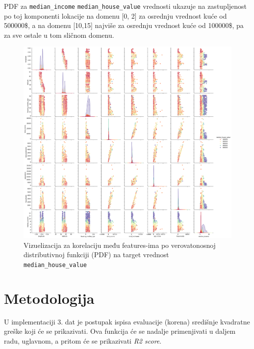 \documentclass[fontsize=12bp, paper=a4]{scrarticle}
\renewcommand\lstlistingname{Implementacija}
\renewcommand\lstlistlistingname{Implementacija}
\begin{document}
PDF za \verb*|median_income| \verb*|median_house_value| vrednosti ukazuje na zastupljenost po toj komponenti lokacije na domenu [0, 2] za osrednju vrednost kuće od 500000\$, a na domenu [10,15] najviše za osrednju vrednost kuće od 100000\$, pa za sve ostale u tom sličnom domenu.


\begin{figure}[h!]
    \centering
    \includegraphics[width=1\textwidth]{1.png}
    \caption{\centering Vizuelizacija za korelaciju među features-ima po verovatonosnoj distributivnoj funkciji (PDF) na target vrednost \texttt{median\_house\_value}}
\end{figure}      


\newpage
\vbox{}
\vbox{}
\vbox{}
\vbox{}
\vbox{}
\vbox{}
\vbox{}

\section{Metodologija}

U implementaciji 3. dat je postupak ispisa evaluacije (korena) središnje kvadratne greške koji će se prikazivati. Ova funkcija će se nadalje primenjivati u daljem radu, uglavnom, a pritom će se prikazivati \textit{R2 score}.

\renewcommand\lstlistingname{Implementacija}
\renewcommand\lstlistlistingname{Implementacija}
\setcounter{lstlisting}{2}
\end{document}

